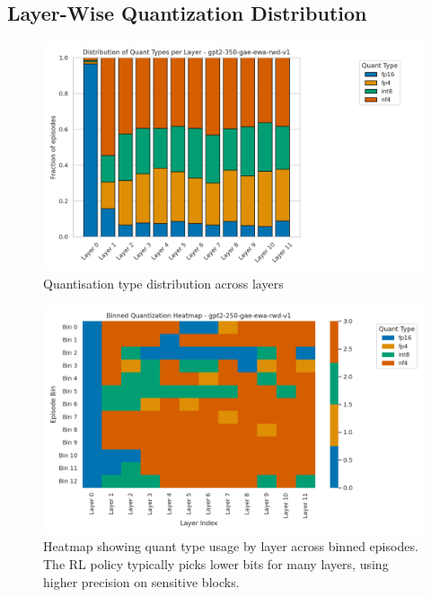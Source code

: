 \documentclass{article}
\begin{document}
	\subsection{Layer-Wise Quantization Distribution}
	\begin{figure}[ht]
		\centering
		\includegraphics[width=0.93\columnwidth]{gpt2-350-gae-ewa-rwd-v1_quant_dist_bar.png}
		\vspace{-0.4em}
		\caption{\small Quantisation type distribution across layers}
		\label{fig:bardist}
		\vspace{-0.5em}
	\end{figure}
	\begin{figure}[ht]
		\centering
		\includegraphics[width=0.93\columnwidth]{gpt2-250-gae-ewa-rwd-v1_quant_heatmap_binned.png}
		\vspace{-0.4em}
		\caption{\small Heatmap showing quant type usage by layer across binned episodes. The RL policy typically picks lower bits for many layers, using higher precision on sensitive blocks.}
		\label{fig:bin_heatmap}
		\vspace{-0.5em}
	\end{figure}
\end{document}
